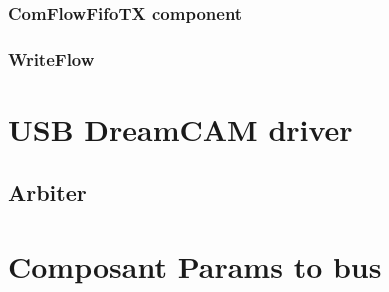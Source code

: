\subsubsection{ComFlowFifoTX component}
\subsubsection{WriteFlow}


\section{USB DreamCAM driver}


\subsection{Arbiter}


\section{Composant Params to bus}

